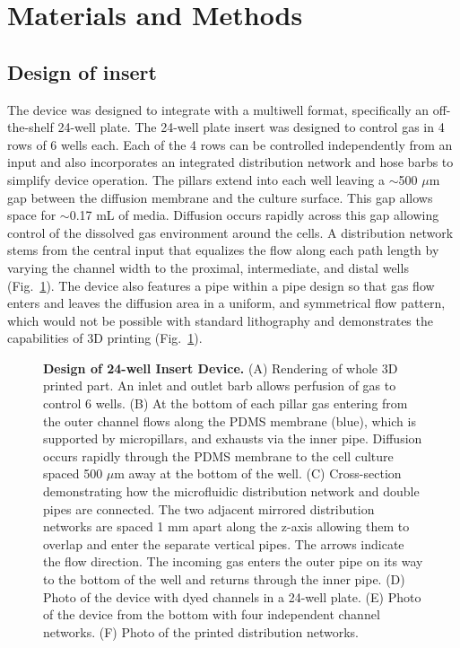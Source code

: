 \documentclass[10pt,letterpaper]{article}
\begin{document}
\section*{Materials and Methods}
\subsection*{Design of insert}

The device was designed to integrate with a multiwell format, specifically an off-the-shelf 24-well plate. 
The 24-well plate insert was designed to control gas in 4 rows of 6 wells each. 
Each of the 4 rows can be controlled independently from an input and also incorporates an integrated distribution network and hose barbs to simplify device operation.
The pillars extend into each well leaving a $\sim$500 $\mu$m gap between the diffusion membrane and the culture surface.
This gap allows space for $\sim$0.17 mL of media.
Diffusion occurs rapidly across this gap allowing control of the dissolved gas environment around the cells. 
A distribution network stems from the central input that equalizes the flow along each path length by varying the channel width to the proximal, intermediate, and distal wells (Fig.~\ref{fig1}).
The device also features a pipe within a pipe design so that gas flow enters and leaves the diffusion area in a uniform, and symmetrical flow pattern, which would not be possible with standard lithography and demonstrates the capabilities of 3D printing (Fig.~\ref{fig1}).


\begin{figure}[h]
\caption{
{\bf Design of 24-well Insert Device.}
(A) Rendering of whole 3D printed part.
An inlet and outlet barb allows perfusion of gas to control 6 wells.
(B) At the bottom of each pillar gas entering from the outer channel flows along the PDMS membrane (blue), which is supported by micropillars, and exhausts via the inner pipe.
Diffusion occurs rapidly through the PDMS membrane to the cell culture spaced 500 $\mu$m away at the bottom of the well.
(C) Cross-section demonstrating how the microfluidic distribution network and double pipes are connected. 
The two adjacent mirrored distribution networks are spaced 1 mm apart along the z-axis allowing them to overlap and enter the separate vertical pipes.
The arrows indicate the flow direction.
The incoming gas enters the outer pipe on its way to the bottom of the well and returns through the inner pipe.
(D) Photo of the device with dyed channels in a 24-well plate.
(E) Photo of the device from the bottom with four independent channel networks.
(F) Photo of the printed distribution networks.
}
\label{fig1}
\end{figure}
\end{document}
